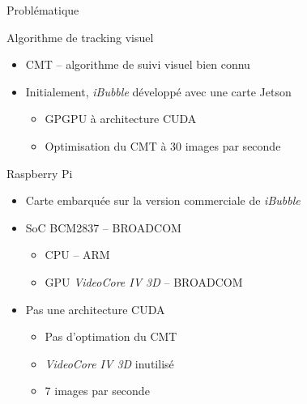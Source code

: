 \documentclass{bredelebeamer}
\begin{document}
\begin{frame}{Problématique}

\begin{block}{Algorithme de tracking visuel}
\begin{itemize}
\item CMT -- algorithme de suivi visuel bien connu
\item Initialement, \emph{iBubble} développé avec une carte Jetson
\begin{itemize}
\item GPGPU à architecture CUDA
\item Optimisation du CMT à 30 images par seconde
\end{itemize}
\end{itemize}
\end{block}

\begin{block}{Raspberry Pi}
\begin{itemize}
	\item Carte embarquée sur la version commerciale de \emph{iBubble}
\item SoC BCM2837 -- BROADCOM
\begin{itemize}
\item CPU -- ARM
\item GPU \emph{VideoCore IV 3D} -- BROADCOM
\end{itemize}
\item Pas une architecture CUDA
\begin{itemize}
	\item Pas d'optimation du CMT
	\item \emph{VideoCore IV 3D} inutilisé
	\item 7 images par seconde
\end{itemize}
\end{itemize}
\end{block}

\end{frame}

\end{document}
